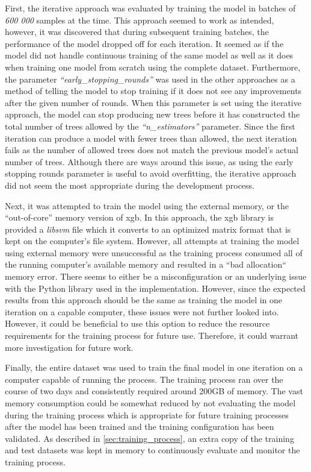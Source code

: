 First, the iterative approach was evaluated by training the model in batches of \textit{600 000} samples at the time. This approach seemed to work as intended, however, it was discovered that during subsequent training batches, the performance of the model dropped off for each iteration. It seemed as if the model did not handle continuous training of the same model as well as it does when training one model from scratch using the complete dataset. Furthermore, the parameter \textit{``early\_stopping\_rounds''} was used in the other approaches as a method of telling the model to stop training if it does not see any improvements after the given number of rounds. When this parameter is set using the iterative approach, the model can stop producing new trees before it has constructed the total number of trees allowed by the \textit{``n\_estimators''} parameter. Since the first iteration can produce a model with fewer trees than allowed, the next iteration fails as the number of allowed trees does not match the previous model's actual number of trees. Although there are ways around this issue, as using the early stopping rounds parameter is useful to avoid overfitting, the iterative approach did not seem the most appropriate during the development process.

Next, it was attempted to train the model using the external memory, or the ``out-of-core'' memory version of \acrshort{xgb}. In this approach, the \acrshort{xgb} library is provided a \textit{libsvm} file which it converts to an optimized matrix format that is kept on the computer's file system. However, all attempts at training the model using external memory were unsuccessful as the training process consumed all of the running computer's available memory and resulted in a ``bad allocation`` memory error. There seems to either be a misconfiguration or an underlying issue with the Python library used in the implementation. However, since the expected results from this approach should be the same as training the model in one iteration on a capable computer, these issues were not further looked into. However, it could be beneficial to use this option to reduce the resource requirements for the training process for future use. Therefore, it could warrant more investigation for future work.

Finally, the entire dataset was used to train the final model in one iteration on a computer capable of running the process. The training process ran over the course of two days and consistently required around 200GB of memory. The vast memory consumption could be somewhat reduced by not evaluating the model during the training process which is appropriate for future training processes after the model has been trained and the training configuration has been validated. As described in \cref{sec:training_process}, an extra copy of the training and test datasets was kept in memory to continuously evaluate and monitor the training process.

